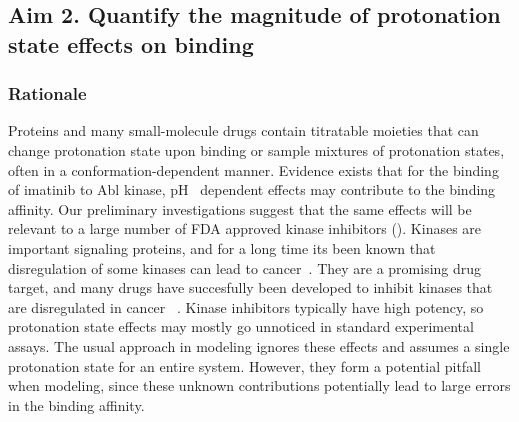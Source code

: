 \documentclass[10pt,final]{article}
\newcommand{\pH}{p$\mathrm{H}$\ }
\begin{document}
\subsection*{Aim 2. Quantify the magnitude of protonation state effects on binding}
\subsubsection*{Rationale}
Proteins and many small-molecule drugs contain titratable moieties that can change protonation state upon binding or sample mixtures of protonation states, often in a conformation-dependent manner.
%
Evidence exists that for the binding of imatinib to Abl kinase, \pH{} dependent effects may contribute to the binding affinity\cite{Szakacs2005a, Seeliger2007a, Lin2013a}. 
%
Our preliminary investigations suggest that the same effects will be relevant to a large number of FDA approved kinase inhibitors ().
%
Kinases are important signaling proteins, and for a long time its been known that disregulation of some kinases can lead to cancer~\autocite{Levinson1978a,Vivanco2002a}.
%
They are a promising drug target, and many drugs have succesfully been developed to inhibit kinases that are disregulated in cancer ~\autocite{Baselga2006a,Garber2006a,OHare2011a}.
%
Kinase inhibitors typically have high potency, so protonation state effects may mostly go unnoticed in standard experimental assays.
%
The usual approach in modeling ignores these effects and assumes a single protonation state for an entire system.
%
However, they form a potential pitfall when modeling, since these unknown contributions potentially lead to large errors in the binding affinity.
\end{document}

